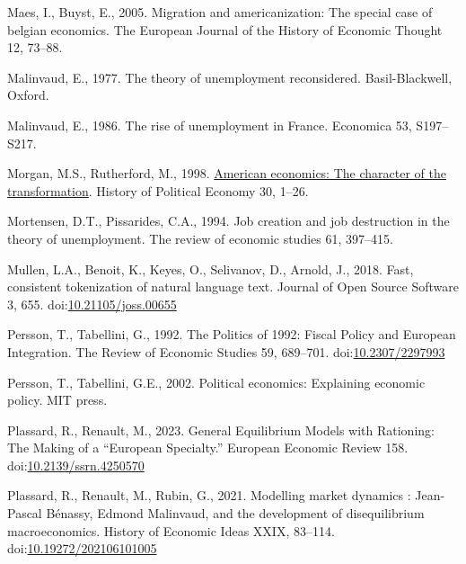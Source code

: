 \documentclass[
  12pt,
  onecolumn]{article}
\newlength{\cslhangindent}
\newlength{\cslentryspacingunit} %
\newenvironment{CSLReferences}[2] %
 {%
  \setlength{\parindent}{0pt}
  \ifodd #1
  \let\oldpar\par
  \def\par{\hangindent=\cslhangindent\oldpar}
  \fi
  \setlength{\parskip}{#2\cslentryspacingunit}
 }%
 {}
\begin{document}
\begin{CSLReferences}{1}{0}
\leavevmode{}%
Maes, I., Buyst, E., 2005. Migration and americanization: The special case of belgian economics. The European Journal of the History of Economic Thought 12, 73--88.

\leavevmode{}%
Malinvaud, E., 1977. The theory of unemployment reconsidered. {Basil-Blackwell}, {Oxford}.

\leavevmode{}%
Malinvaud, E., 1986. The rise of unemployment in {France}. Economica 53, S197--S217.

\leavevmode{}%
Morgan, M.S., Rutherford, M., 1998. \href{http://search.ebscohost.com/login.aspx?direct=true\&db=bth\&AN=7752144\&lang=fr\&site=ehost-live}{American economics: The character of the transformation}. History of Political Economy 30, 1--26.

\leavevmode{}%
Mortensen, D.T., Pissarides, C.A., 1994. Job creation and job destruction in the theory of unemployment. The review of economic studies 61, 397--415.

\leavevmode{}%
Mullen, L.A., Benoit, K., Keyes, O., Selivanov, D., Arnold, J., 2018. Fast, consistent tokenization of natural language text. Journal of Open Source Software 3, 655. doi:\href{https://doi.org/10.21105/joss.00655}{10.21105/joss.00655}

\leavevmode{}%
Persson, T., Tabellini, G., 1992. The {Politics} of 1992: {Fiscal Policy} and {European Integration}. The Review of Economic Studies 59, 689--701. doi:\href{https://doi.org/10.2307/2297993}{10.2307/2297993}

\leavevmode{}%
Persson, T., Tabellini, G.E., 2002. Political economics: Explaining economic policy. {MIT press}.

\leavevmode{}%
Plassard, R., Renault, M., 2023. General {Equilibrium Models} with {Rationing}: {The Making} of a {``{European Specialty}.''} European Economic Review 158. doi:\href{https://doi.org/10.2139/ssrn.4250570}{10.2139/ssrn.4250570}

\leavevmode{}%
Plassard, R., Renault, M., Rubin, G., 2021. Modelling market dynamics : {Jean-Pascal Bénassy}, {Edmond Malinvaud}, and the development of disequilibrium macroeconomics. History of Economic Ideas XXIX, 83--114. doi:\href{https://doi.org/10.19272/202106101005}{10.19272/202106101005}


\end{CSLReferences}
\end{document}
